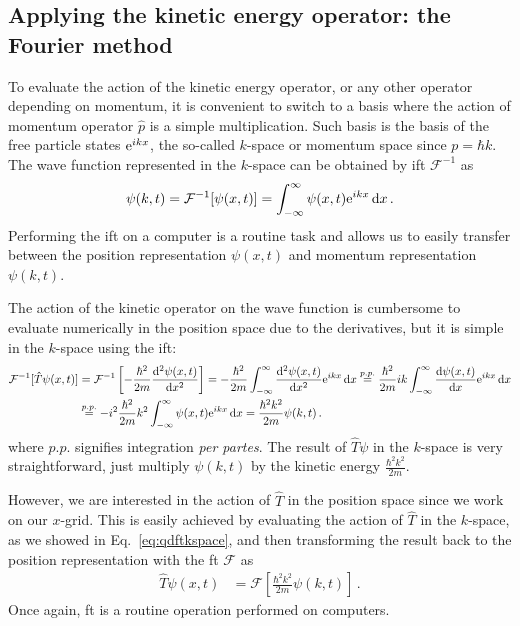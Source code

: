 \subsection{Applying the kinetic energy operator: the Fourier method}


To evaluate the action of the kinetic energy operator, or any other operator depending on momentum, it is convenient to switch to a basis where the action of momentum operator $\hat{p}$ is a simple multiplication. Such basis is the basis of the free particle states $\mathrm{e}^{ikx}$, the so-called $k$-space or momentum space since $p = \hbar k$. The wave function represented in the $k$-space can be obtained by \acrfull{ift} $\mathcal{F}^{-1}$ as
\begin{align}
    \psi(k,t) = \mathcal{F}^{-1}[\psi(x,t)] =\int_{-\infty}^\infty \psi(x,t) \mathrm{e}^{ikx}\mathop{}\!\mathrm{d} x \, .
\end{align}
Performing the \acrshort{ift} on a computer is a routine task and allows us to easily transfer between the position representation $\psi(x,t)$ and momentum representation $\psi(k,t)$.

The action of the kinetic operator on the wave function is cumbersome to evaluate numerically in the position space due to the derivatives, but it is simple in the $k$-space using the \acrshort{ift}:
\begin{align}
    \mathcal{F}^{-1}[\hat{T}\psi(x,t)] &= \mathcal{F}^{-1}\left[-\frac{\hbar^2}{2m}\frac{\dd^2 \psi(x,t)}{\dd x^2}\right] = -\frac{\hbar^2}{2m} \int_{-\infty}^\infty \frac{\dd^2 \psi(x,t)}{\dd x^2}  \e^{ikx}\dd x \stackrel{p.p.}{=} \frac{\hbar^2}{2m} i k \int_{-\infty}^\infty \frac{\dd \psi(x,t)}{\dd x} \e^{ikx}\dd x \notag \\
    &\stackrel{p.p.}{=} - i^2 \frac{\hbar^2}{2m} k^2 \int_{-\infty}^\infty \psi(x,t) \e^{ikx}\dd x = \frac{\hbar^2 k^2}{2m} \psi(k,t) \, .
    \label{eq:qdftkspace}
\end{align}
where $p.p.$ signifies integration \textit{per partes}. The result of $\hat{T}\psi$ in the $k$-space is very straightforward, just multiply $\psi(k,t)$ by the kinetic energy $\frac{\hbar^2 k^2}{2m}$.

However, we are interested in the action of $\hat{T}$ in the position space since we work on our $x$-grid. This is easily achieved by evaluating the action of $\hat{T}$ in the $k$-space, as we showed in Eq.~\eqref{eq:qdftkspace}, and then transforming the result back to the position representation with the \acrfull{ft} $\mathcal{F}$ as
\begin{align}
    \hat{T}\psi(x,t) &= \mathcal{F}\left[\frac{\hbar^2 k^2}{2m} \psi(k,t)\right] \, .
\end{align}
Once again, \acrshort{ft} is a routine operation performed on computers.

